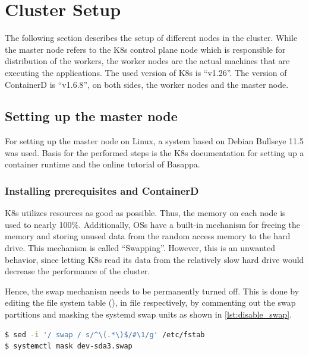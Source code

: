 

\section{Cluster Setup}
The following section describes the setup of different nodes in the cluster. While the master node refers to the \ac{K8s} control plane node which is responsible for distribution of the workers, the worker nodes are the actual machines that are executing the applications.
The used version of \ac{K8s} is \enquote{v1.26}. The version of ContainerD is \enquote{v1.6.8}, on both sides, the worker nodes and the master node.

\subsection{Setting up the master node}
For setting up the master node on Linux, a system based on Debian Bullseye 11.5 was used. Basis for the performed steps is the \ac{K8s} documentation for setting up a container runtime\cite{Kubernetes.2019} and the online tutorial of Basappa\cite{Basappa.2022}.

\subsubsection{Installing prerequisites and ContainerD}
\ac{K8s} utilizes resources as good as possible. Thus, the memory on each node is used to nearly 100\%.
Additionally, \acp{OS} have a built-in mechanism for freeing the memory and storing unused data from the random access memory to the hard drive. This mechanism is called \enquote{Swapping}.
However, this is an unwanted behavior, since letting \ac{K8s} read its data from the relatively slow hard drive would decrease the performance of the cluster.

Hence, the swap mechanism needs to be permanently turned off. This is done by editing the file system table (), in file  respectively, by commenting out the swap partitions and masking the systemd swap units as shown in \autoref{lst:disable_swap}.
\begin{lstlisting}[label=lst:disable_swap, caption={Bash commands for disabling Swap mechanism and masking.}, language=bash]
$ sed -i '/ swap / s/^\(.*\)$/#\1/g' /etc/fstab
$ systemctl mask dev-sda3.swap
\end{lstlisting}

